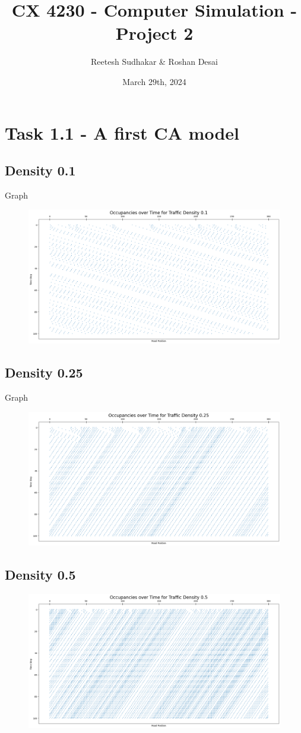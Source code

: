 \documentclass{article}
\title{CX 4230 - Computer Simulation - Project 2}
\author{Reetesh Sudhakar \& Roshan Desai}
\date{March 29th, 2024}
\begin{document}
\maketitle

\section{Task 1.1 - A first CA model}
\subsection{Density 0.1}
Graph
\begin{figure}[!h]
    \centering
    \includegraphics[width=0.75\linewidth]{assets/d0.1.png}
\end{figure}
\subsection{Density 0.25}
Graph
\begin{figure}[!h]
    \centering
    \includegraphics[width=0.75\linewidth]{assets/d0.25.png}
\end{figure}

\newpage
\subsection{Density 0.5}
\begin{figure}[!h]
    \centering
    \includegraphics[width=0.75\linewidth]{assets/d0.5.png}
\end{figure}
\end{document}
